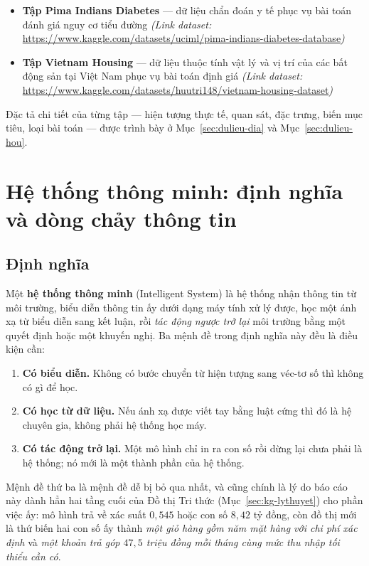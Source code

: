 \begin{itemize}
  \item \textbf{Tập Pima Indians Diabetes} --- dữ liệu chẩn đoán y tế phục vụ
        bài toán đánh giá nguy cơ tiểu đường \emph{(Link dataset:}
        \url{https://www.kaggle.com/datasets/uciml/pima-indians-diabetes-database}\emph{)}
  \item \textbf{Tập Vietnam Housing} --- dữ liệu thuộc tính vật lý và vị trí của
        các bất động sản tại Việt Nam phục vụ bài toán định giá
        \emph{(Link dataset:}
        \url{https://www.kaggle.com/datasets/huutri148/vietnam-housing-dataset}\emph{)}
\end{itemize}

\noindent Đặc tả chi tiết của từng tập --- hiện tượng thực tế, quan sát, đặc
trưng, biến mục tiêu, loại bài toán --- được trình bày ở Mục~\ref{sec:dulieu-dia}
và Mục~\ref{sec:dulieu-hou}.

\section{Hệ thống thông minh: định nghĩa và dòng chảy thông tin}
\label{sec:dinhnghia-httm}

\subsection{Định nghĩa}

Một \textbf{hệ thống thông minh} (Intelligent System) là hệ thống nhận thông
tin từ môi trường, biểu diễn thông tin ấy dưới dạng máy tính xử lý được, học
một ánh xạ từ biểu diễn sang kết luận, rồi \emph{tác động ngược trở lại} môi
trường bằng một quyết định hoặc một khuyến nghị. Ba mệnh đề trong định nghĩa
này đều là điều kiện cần:

\begin{enumerate}
  \item \textbf{Có biểu diễn.} Không có bước chuyển từ hiện tượng sang véc-tơ
        số thì không có gì để học.
  \item \textbf{Có học từ dữ liệu.} Nếu ánh xạ được viết tay bằng luật cứng thì
        đó là hệ chuyên gia, không phải hệ thống học máy.
  \item \textbf{Có tác động trở lại.} Một mô hình chỉ in ra con số rồi dừng lại
        chưa phải là hệ thống; nó mới là một thành phần của hệ thống.
\end{enumerate}

Mệnh đề thứ ba là mệnh đề dễ bị bỏ qua nhất, và cũng chính là lý do báo cáo này
dành hẳn hai tầng cuối của Đồ thị Tri thức (Mục~\ref{sec:kg-lythuyet}) cho phần
việc ấy: mô hình trả về xác suất $0{,}545$ hoặc con số $8{,}42$ tỷ đồng, còn đồ
thị mới là thứ biến hai con số ấy thành \emph{một giỏ hàng gồm năm mặt hàng với
chi phí xác định} và \emph{một khoản trả góp $47{,}5$ triệu đồng mỗi tháng cùng
mức thu nhập tối thiểu cần có}.

